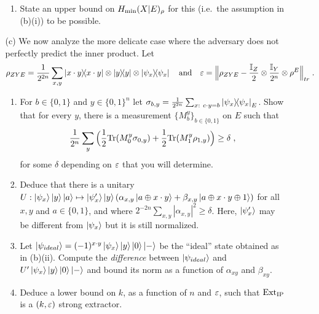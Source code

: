 \documentclass[12pt]{article}
\begin{document}
\begin{enumerate}
\begin{enumerate}
\begin{enumerate}
\item State an upper bound on $H_{\rm min}(X|E)_\rho$ for this (i.e.\ the assumption in (b)(i)) to be possible. 
\end{enumerate}
\item[(c)] We now analyze the more delicate case where the adversary does not perfectly predict the inner product. Let 
\[ \rho_{ZYE}=\frac{1}{2^{2n}}\sum_{x,y} \ket{x\cdot y}\!\!\bra{x\cdot y}\otimes \ket{y}\!\!\bra{y}\otimes\ket{\psi_x}\!\!\bra{\psi_x}\quad\text{and}\quad\varepsilon = \Big\|\rho_{ZYE} - \frac{\mathbb{I}_Z}{2} \otimes \frac{\mathbb{I}_Y}{2^n}  \otimes \rho^E\Big\|_{tr}\;.\]
 \begin{enumerate}
\item For $b\in\{0,1\}$ and $y\in\{0,1\}^n$ let $\sigma_{b,y} = \frac{1}{2^{2n}}\sum_{x:\ c\cdot y=b} \proj{\psi_x}_E$. 
 Show that for every $y$, there is a measurement $\{M^y_b\}_{b\in\{0,1\}}$ on $E$ such that 
\[\frac{1}{2^n}\sum_y \Big(  \frac{1}{2}\mathrm{Tr}(M^y_{0} \sigma_{0,y})+\frac{1}{2}\mathrm{Tr}(M^y_{1} \rho_{1,y})\Big) \geq \delta\;,\]
 for some $\delta$ depending on $\varepsilon$ that you will determine. 
\item Deduce that there is a unitary $U:\ket{\psi_x}\ket{y}\ket{a} \mapsto \ket{\psi'_x}\ket{y}(\alpha_{x,y}\ket{a\oplus x\cdot y}+\beta_{x,y}\ket{a\oplus x\cdot y\oplus 1})$ for all $x,y$ and $a\in\{0,1\}$, and where $2^{-2n}\sum_{x,y} |\alpha_{x,y}|^2 \geq \delta$. Here, $\ket{\psi'_x}$ may be different from $\ket{\psi_x}$ but it is still normalized.
\item Let $\ket{\psi_{ideal}} = (-1)^{x\cdot y}\ket{\psi_x}\ket{y}\ket{0}\ket{-}$ be the ``ideal'' state obtained as in (b)(ii). Compute the \emph{difference} between $\ket{\psi_{ideal}}$ and $U'\ket{\psi_x}\ket{y}\ket{0}\ket{-}$ and bound its norm as a function of $\alpha_{xy}$ and $\beta_{xy}$.
\item Deduce a lower bound on $k$, as a function of $n$ and $\varepsilon$, such that $\mathrm{Ext}_{\mathrm{IP}}$ is a $(k,\varepsilon)$ strong extractor.  
\end{enumerate}
\end{enumerate}

\end{enumerate}
\end{document}
